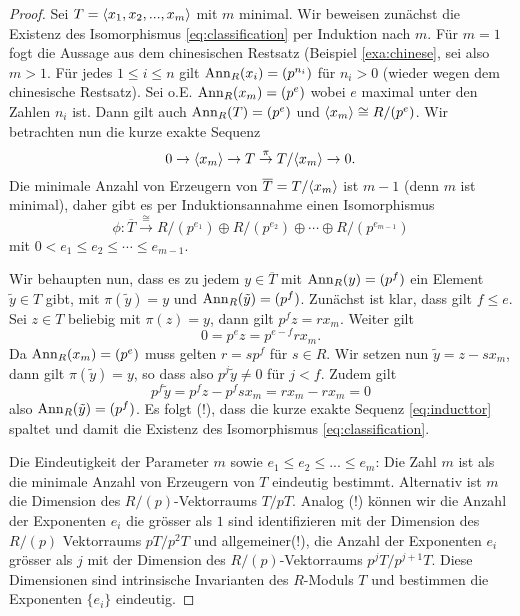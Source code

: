 \documentclass{book}
\begin{document}
\begin{proof}
    Sei $T = \langle  x_1, x_2, ..., x_m  \rangle$ mit $m$ minimal. Wir beweisen zunächst die
    Existenz des Isomorphismus \eqref{eq:classification} per Induktion nach
    $m$. Für $m=1$ fogt die Aussage aus dem chinesischen Restsatz (Beispiel
    \ref{exa:chinese}, sei also $m>1$. Für jedes $1 \le i \le n$ gilt
    $\operatorname{Ann}_R(x_i) = (p^{n_i})$ für $n_i >0$ (wieder wegen dem chinesische
    Restsatz). Sei o.E. $\operatorname{Ann}_R(x_m) = (p^{e})$ wobei $e$ maximal unter den
    Zahlen $n_i$ ist. Dann gilt auch $\operatorname{Ann}_R(T) = (p^e)$ und $\langle  x_m  \rangle \cong
    R/(p^e)$. Wir betrachten nun die kurze exakte Sequenz
    \begin{equation}\label{eq:inducttor}
        0 \to \langle  x_m  \rangle \to T \overset{\pi}{\to} T/\langle  x_m  \rangle \to 0.
    \end{equation}
    Die minimale Anzahl von Erzeugern von $\overline{T} = T/\langle  x_m  \rangle$ ist
    $m-1$ (denn $m$ ist minimal), daher gibt es per Induktionsannahme einen Isomorphismus
    \[
        \phi: \overline{T} \overset{\cong}{\to} R/(p^{e_1}) \oplus R/(p^{e_2}) \oplus \cdots \oplus R/(p^{e_{m-1}})
    \]
    mit $0 < e_1 \le e_2 \le \cdots \le e_{m-1}$.

    Wir behaupten nun, dass es zu jedem $y \in \overline{T}$ mit
    $\operatorname{Ann}_R(y) = (p^f)$ ein Element $\tilde{y} \in T$ gibt, mit $\pi(\tilde{y}) =
    y$ und $\operatorname{Ann}_R(\tilde{y}) = (p^f)$. Zunächst ist klar, dass gilt $f \le e$. Sei $z
    \in T$ beliebig mit $\pi(z) = y$, dann gilt $p^fz = r x_m$. Weiter gilt
    \[
        0 = p^e z = p^{e-f} r x_m.
    \]
    Da $\operatorname{Ann}_R(x_m) = (p^e)$ muss gelten $r = s p^f$ für $s \in R$. Wir setzen
    nun $\tilde{y} = z - s x_m$, dann gilt $\pi(\tilde{y}) = y$, so dass also $p^j \tilde{y} \ne 0$ für
    $j < f$. Zudem gilt
    \[
        p^f \tilde{y} = p^f z - p^f s x_m = r x_m - r x_m = 0
    \]
    also $\operatorname{Ann}_R(\tilde{y}) = (p^f)$. Es folgt (!), dass die kurze exakte Sequenz
    \eqref{eq:inducttor} spaltet und damit die Existenz des Isomorphismus
    \eqref{eq:classification}.

    Die Eindeutigkeit der Parameter $m$ sowie $e_1 \le e_2 \le ... \le e_m$:
    Die Zahl $m$ ist als die minimale Anzahl von Erzeugern von $T$ eindeutig
    bestimmt. Alternativ ist $m$ die Dimension des $R/(p)$-Vektorraums $T/pT$.
    Analog (!) können wir die Anzahl der Exponenten $e_i$ die grösser als $1$ sind
    identifizieren mit der Dimension des $R/(p)$ Vektorraums $pT/p^2T$ und
    allgemeiner(!), die Anzahl der Exponenten $e_i$ grösser als $j$ mit der
    Dimension des $R/(p)$-Vektorraums $p^jT/p^{j+1}T$. Diese Dimensionen sind
    intrinsische Invarianten des $R$-Moduls $T$ und bestimmen die Exponenten
    $\{e_i\}$ eindeutig. 
\end{proof}
\end{document}
